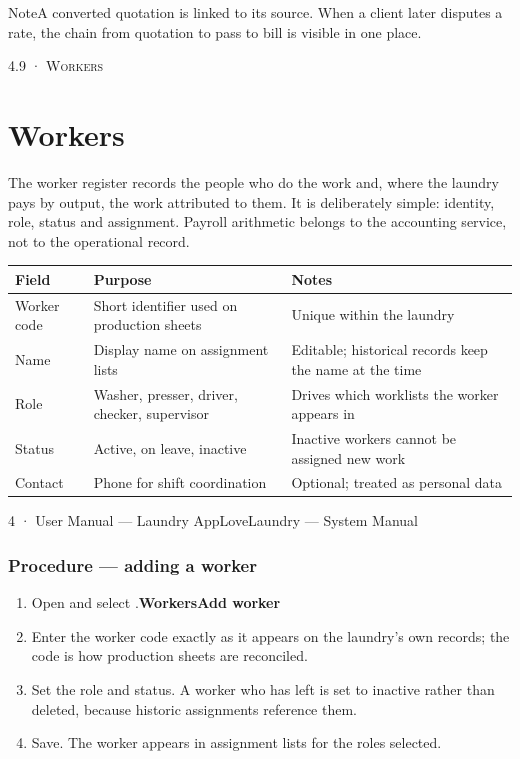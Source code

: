 \documentclass[11pt,a4paper,oneside]{book}
\begin{document}
\begin{notebox}NoteA converted quotation is linked to its source. When a client later disputes a rate, the chain from quotation to pass to bill is visible in one place.\end{notebox}
\textsc{\small\color{crimson}4.9 · Workers}\par\medskip
\section*{Workers}
The worker register records the people who do the work and, where the laundry pays by output, the work attributed to them. It is deliberately simple: identity, role, status and assignment. Payroll arithmetic belongs to the accounting service, not to the operational record.

\begin{center}\small
\begin{tabularx}{\linewidth}{|X|X|X|}
\hline
\rowcolor{lightgrey}
\textbf{Field} & \textbf{Purpose} & \textbf{Notes} \\ \hline
Worker code & Short identifier used on production sheets & Unique within the laundry \\ \hline
Name & Display name on assignment lists & Editable; historical records keep the name at the time \\ \hline
Role & Washer, presser, driver, checker, supervisor & Drives which worklists the worker appears in \\ \hline
Status & Active, on leave, inactive & Inactive workers cannot be assigned new work \\ \hline
Contact & Phone for shift coordination & Optional; treated as personal data \\ \hline
\end{tabularx}
\end{center}
4 · User Manual — Laundry AppLoveLaundry — System Manual

\subsubsection*{Procedure — adding a worker}
\begin{enumerate}
\item Open  and select .\textbf{Workers}\textbf{Add worker}
\item Enter the worker code exactly as it appears on the laundry's own records; the code is how production sheets are reconciled.
\item Set the role and status. A worker who has left is set to inactive rather than deleted, because historic assignments reference them.
\item Save. The worker appears in assignment lists for the roles selected.
\end{enumerate}
\end{document}
